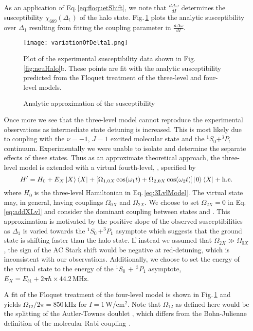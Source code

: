 As an application of Eq.\,\ref{eq:floquetShift}, we note that $\frac{d \Delta\omega}{d I}$ determines the susceptibility $\chi_{689}(\Delta_1)$ of the halo state.
Fig.\,\ref{fig:floquetFitChi} plots the analytic susceptibility over $\Delta_1$ resulting from fitting the coupling parameter in $\frac{d \Delta\omega}{d I}$.
	\begin{figure} 
	\centerline{
	  \texttt{[image: variationOfDelta1.png]}}
	  \caption{Analytic approximation of the susceptibility}{Plot of the experimental susceptibility data shown in Fig.\,\ref{fig:neuHalo}b. These points are fit with the analytic susceptibility predicted from the Floquet treatment of the three-level and four-level models.}
	  \label{fig:floquetFitChi}
	\end{figure}
Once more we see that the three-level model cannot reproduce the experimental observations as intermediate state detuning is increased.
This is most likely due to coupling with the $\nu=-1$, $J=1$ excited molecular state and the $^1S_0$+$^3P_1$ continuum.
Experimentally we were unable to isolate and determine the separate effects of these states.
Thus as an approximate theoretical approach, the three-level model is extended with a virtual fourth-level, , specified by
\begin{equation} \label{eq:addXLvl}
	H'=H_0 + E_X\left| {X} \right>\left< {X} \right| + \left[ \Omega_{1,0X}\cos(\omega_1t) + \Omega_{2,0X}\cos(\omega_2t) \right] \left| {0} \right>\left< {X} \right| + \text{h.c.}
\end{equation}
where $H_0$ is the three-level Hamiltonian in Eq.\,\ref{eq:3LvlModel}.
The virtual state  may, in general, having couplings $\Omega_{0X}$ and $\Omega_{2X}$.
We choose to set $\Omega_{2X} = 0$ in Eq.\,\ref{eq:addXLvl} and consider the dominant coupling between states  and .
This approximation is motivated by the positive slope of the observed susceptibilities as $\Delta_1$ is varied towards the $^1S_0\,+^3P_1$ asymptote which suggests that the ground state is shifting faster than the halo state.
If instead we assumed that $\Omega_{2X} \gg \Omega_{0X}$, the sign of the AC Stark shift would be negative at red-detuning, which is inconsistent with our observations.
Additionally, we choose to set the energy of the virtual state to the energy of the $^1S_0\,+\,^3P_1$ asymptote, $E_X = E_{b1} + 2\pi\hbar \times 44.2$\,MHz.

A fit of the Floquet treatment of the four-level model is shown in Fig.\,\ref{fig:floquetFitChi} and yields $\Omega_{12}/2\pi=850$\,kHz for $I=1$\,W/cm$^2$.
Note that $\Omega_{12}$ as defined here would be the splitting of the Autler-Townes doublet \cite{Pachomow2017a}, which differs from the Bohn-Julienne definition of the molecular Rabi coupling \cite{bju96}.

